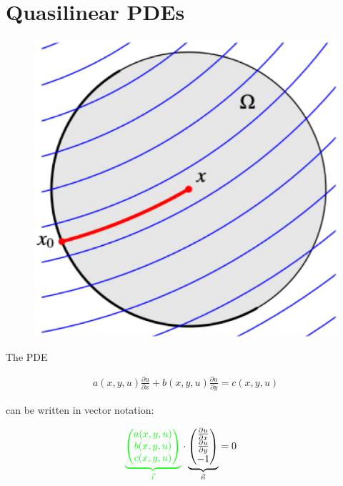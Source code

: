 \section{Quasilinear PDEs}\label{sec:quasilinear-pdes}

\label{subsec:characteristics}

\begin{figure}
    \centering
    \includegraphics[width=0.4\columnwidth]{images/quasilinear}
\end{figure}

The PDE

\begin{align*}
    a(x,y,u)\frac{\partial u}{\partial x}+b(x,y,u)\frac{\partial u}{\partial y} = c(x,y,u)
\end{align*}

can be written in vector notation:

\begin{align*}
{\color{green}
\underbrace{
    \begin{pmatrix}
        a(x,y,u) \\
        b(x,y,u) \\
        c(x,y,u)
    \end{pmatrix}
}_{\vec t}
}
    \cdot
    {\color{black}
    \underbrace{
        \begin{pmatrix}
            \frac{\partial u}{\partial x} \\
            \frac{\partial u}{\partial y} \\
            -1
        \end{pmatrix}
    }_{\vec{n}}
    }
    &= 0
\end{align*}

